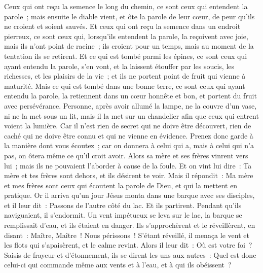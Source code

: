 \begin{multicols}{2}
Ceux qui ont reçu la semence le long du chemin, ce sont ceux qui entendent la parole~; mais ensuite le diable vient, et ôte la parole de leur cœur, de peur qu'ils ne croient et soient sauvés.
Et ceux qui ont reçu la semence dans un endroit pierreux, ce sont ceux qui, lorsqu'ils entendent la parole, la reçoivent avec joie, mais ils n'ont point de racine~; ils croient pour un temps, mais au moment de la tentation ils se retirent.
Et ce qui est tombé parmi les épines, ce sont ceux qui ayant entendu la parole, s'en vont, et la laissent étouffer par les soucis, les richesses, et les plaisirs de la vie~; et ils ne portent point de fruit qui vienne à maturité.
Mais ce qui est tombé dans une bonne terre, ce sont ceux qui ayant entendu la parole, la retiennent dans un cœur honnête et bon, et portent du fruit avec persévérance.
Personne, après avoir allumé la lampe, ne la couvre d'un vase, ni ne la met sous un lit, mais il la met sur un chandelier afin que ceux qui entrent voient la lumière.
Car il n'est rien de secret qui ne doive être découvert, rien de caché qui ne doive être connu et qui ne vienne en évidence.
Prenez donc garde à la manière dont vous écoutez~; car on donnera à celui qui a, mais à celui qui n'a pas, on ôtera même ce qu'il croit avoir.
Alors sa mère et ses frères vinrent vers lui~; mais ils ne pouvaient l'aborder à cause de la foule.
Et on vint lui dire~: Ta mère et tes frères sont dehors, et ils désirent te voir.
Mais il répondit~: Ma mère et mes frères sont ceux qui écoutent la parole de Dieu, et qui la mettent en pratique.
Or il arriva qu'un jour Jésus monta dans une barque avec ses disciples, et il leur dit~: Passons de l'autre côté du lac. Et ils partirent.
Pendant qu'ils naviguaient, il s'endormit. Un vent impétueux se leva sur le lac, la barque se remplissait d'eau, et ils étaient en danger.
Ils s'approchèrent et le réveillèrent, en disant~: Maître, Maître~! Nous périssons~! S'étant réveillé, il menaça le vent et les flots qui s'apaisèrent, et le calme revint.
Alors il leur dit~: Où est votre foi~? Saisis de frayeur et d'étonnement, ils se dirent les uns aux autres~: Quel est donc celui-ci qui commande même aux vents et à l'eau, et à qui ils obéissent~?

\end{multicols}
